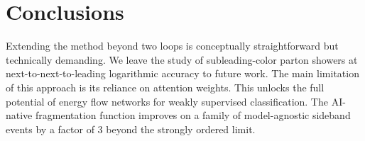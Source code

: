 \section{Conclusions}\label{sec:conclusions}

Extending the method beyond two loops is conceptually straightforward
but technically demanding. We leave the study of subleading-color parton
showers at next-to-next-to-leading logarithmic accuracy to future work.
The main limitation of this approach is its reliance on attention
weights. This unlocks the full potential of energy flow networks for
weakly supervised classification. The AI-native fragmentation function
improves on a family of model-agnostic sideband events by a factor of 3
beyond the strongly ordered limit.

